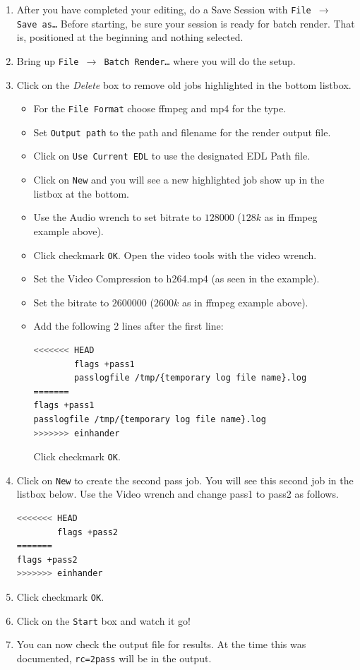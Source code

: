 \begin{enumerate}
    \item After you have completed your editing, do a Save Session with \texttt{File $\rightarrow$ Save as\dots}
    Before starting, be sure your session is ready for batch render. That is, positioned at the beginning and nothing selected.
    \item Bring up \texttt{File $\rightarrow$ Batch Render\dots} where you will do the setup.
    \item Click on the \textit{Delete} box  to remove old jobs highlighted in the bottom listbox.
    \begin{itemize}
        \item For the \texttt{File Format} choose ffmpeg and mp4 for the type.
        \item Set \texttt{Output path} to the path and filename for the render output file.
        \item Click on \texttt{Use Current EDL} to use the designated EDL Path file.
        \item Click on \texttt{New} and you will see a new highlighted job show up in the listbox at the bottom.
        \item Use the Audio wrench to set bitrate to $128000$ ($128k$ as in ffmpeg example above).
        \item Click checkmark \texttt{OK}.  Open the video tools with the video wrench.
        \item Set the Video Compression to h264.mp4 (as seen in the example).
        \item Set the bitrate to $2600000$ ($2600k$ as in ffmpeg example above).
        \item Add the following 2 lines after the first line:
        \begin{lstlisting}[language=bash]
<<<<<<< HEAD
        flags +pass1
        passlogfile /tmp/{temporary log file name}.log
=======
flags +pass1
passlogfile /tmp/{temporary log file name}.log
>>>>>>> einhander
        \end{lstlisting}
        Click checkmark \texttt{OK}.
    \end{itemize}    
    \item Click on \texttt{New} to create the second pass job.  You will see this second job in the listbox below.
     Use the Video wrench and change pass1 to pass2 as follows.
        \begin{lstlisting}[language=bash]
<<<<<<< HEAD
        flags +pass2
=======
flags +pass2
>>>>>>> einhander
        \end{lstlisting}
    \item Click checkmark \texttt{OK}.
    \item Click on the \texttt{Start} box and watch it go!
    \item You can now check the output file for results.  At the time this was documented, \texttt{rc=2pass} will be
        in the output.    
\end{enumerate}

